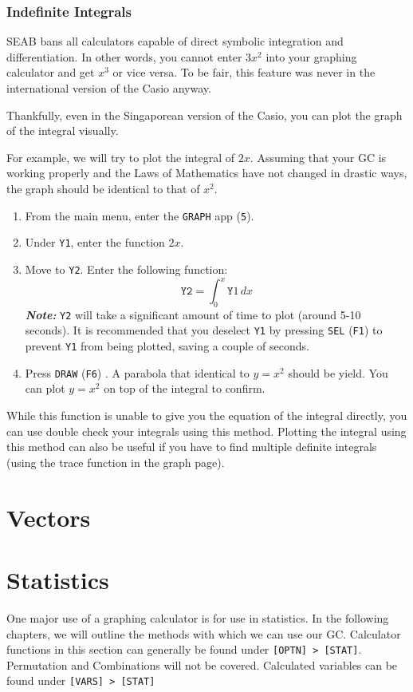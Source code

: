 \documentclass[a5paper,draft]{memoir}
\def\code#1{\texttt{#1}}
\def\note#1{\textbf{\textit{Note:}} #1}
\def\Fone{(\code{F1}) }
\def\Fsix{(\code{F6}) }
\begin{document}
\subsection{Indefinite Integrals}
SEAB bans all calculators capable of direct symbolic integration and differentiation. In other words, you cannot enter $3x^2$ into your graphing calculator and get $x^3$ or vice versa. To be fair, this feature was never in the international version of the Casio anyway.

Thankfully, even in the Singaporean version of the Casio, you can plot the graph of the integral visually.

For example, we will try to plot the integral of $2x$. Assuming that your GC is working properly and the Laws of Mathematics have not changed in drastic ways, the graph should be identical to that of $x^2$.

\begin{enumerate}
	\item From the main menu, enter the \code{GRAPH} app (\code{5}).
	\item Under \code{Y1}, enter the function $2x$.
	\item Move to \code{Y2}. Enter the following function:
	\begin{equation*}
	\code{Y2}=\int_{0}^{x} \code{Y}1 \, dx
	\end{equation*}
	\note{\code{Y2} will take a significant amount of time to plot (around 5-10 seconds). It is recommended that you deselect \code{Y1} by pressing \code{SEL} \Fone to prevent \code{Y1} from being plotted, saving a couple of seconds.}
	\item Press \code{DRAW} \Fsix. A parabola that identical to $y=x^2$ should be yield. You can plot $y=x^2$ on top of the integral to confirm.
\end{enumerate}

While this function is unable to give you the equation of the integral directly, you can use double check your integrals using this method. Plotting the integral using this method can also be useful if you have to find multiple definite integrals (using the trace function in the graph page).

\chapter{Vectors} \label{vectors}

\chapter{Statistics}
One major use of a graphing calculator is for use in statistics. In the following chapters, we will outline the methods with which we can use our GC. Calculator functions in this section can generally be found under \code{[OPTN] > [STAT]}. Permutation and Combinations will not be covered. Calculated variables can be found under \code{[VARS] > [STAT]}
\end{document}
